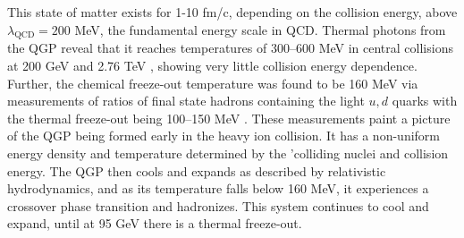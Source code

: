This state of matter exists for 1-10 fm/c, depending on the collision energy, above $\lambda_{\mathrm{QCD}} = 200$ MeV, the fundamental energy scale in QCD. Thermal photons from the QGP reveal that it reaches temperatures of 300--600 MeV in central collisions at 200 GeV \cite{PhysRevLett.104.132301} and 2.76 TeV \cite{2016235}, showing very little collision energy dependence. Further, the chemical freeze-out temperature was found to be 160 MeV via measurements of ratios of final state hadrons containing the light $u, d$ quarks \cite{Fodor_2004, ADAMS2005102, PhysRevC.93.024917} with the thermal freeze-out being 100--150 MeV \cite{PhysRevC.69.024904, PhysRevC.72.014908, PhysRevC.75.024910, PhysRevC.88.044910}. These measurements paint a picture of the QGP being formed early in the heavy ion collision. It has a non-uniform energy density and temperature determined by the 'colliding nuclei and collision energy. The QGP then cools and expands as described by relativistic hydrodynamics, and as its temperature falls below 160 MeV, it experiences a crossover phase transition and hadronizes. This system continues to cool and expand, until at 95 GeV there is a thermal freeze-out. 





